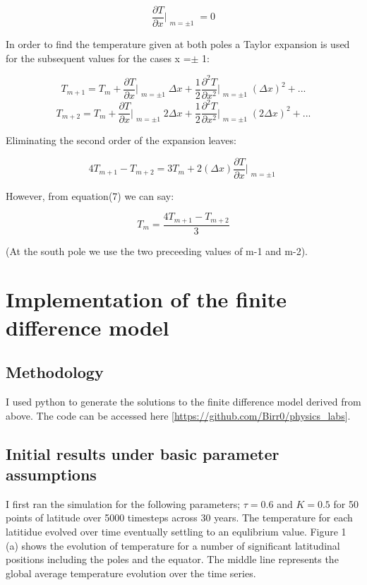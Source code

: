 \documentclass{article}%
\begin{document}
\begin{equation}
  \frac{\partial T}{\partial x} \Bigr|_{\substack{m = \pm 1}} = 0
\end{equation}

In order to find the temperature given at both poles a Taylor expansion is used for the subsequent values for the cases x =$\pm$ 1:

$$T_{m+1} = T_{m} + \frac{\partial T}{\partial x} \Bigr|_{\substack{m = \pm 1}} \Delta x + \frac{1}{2} \frac{\partial^2 T}{\partial x^2} \Bigr|_{\substack{m = \pm 1}}(\Delta x)^2 + ...$$
$$T_{m+2} = T_{m} + \frac{\partial T}{\partial x} \Bigr|_{\substack{m = \pm 1}} 2\Delta x + \frac{1}{2} \frac{\partial^2 T}{\partial x^2} \Bigr|_{\substack{m = \pm 1}}(2\Delta x)^2 + ...$$

Eliminating the second order of the expansion leaves:

$$ 4T_{m+1} - T_{m+2} = 3T_{m} + 2(\Delta x)\frac{\partial T}{\partial x} \Bigr|_{\substack{m = \pm 1}} $$

However, from equation(7) we can say:

\begin{equation}
  T_{m} = \frac{4T_{m+1} - T_{m+2}}{3}
\end{equation}

(At the south pole we use the two preceeding values of m-1 and m-2).


\section{Implementation of the finite difference model}
\subsection{Methodology}
I used python to generate the solutions to the finite difference model derived from above. The code can be accessed here [\url{https://github.com/Birr0/physics_labs}].

\subsection{Initial results under basic parameter assumptions}
I first ran the simulation for the following parameters;
$\tau = 0.6$ and $K = 0.5$ for 50 points of latitude over 5000 timesteps across 30 years.
The temperature for each latitidue evolved over time eventually settling to an equlibrium value.
Figure 1 (a) shows the evolution of temperature for a number of significant latitudinal positions including the poles and the equator. 
The middle line represents the global average temperature evolution over the time series.
\end{document}

